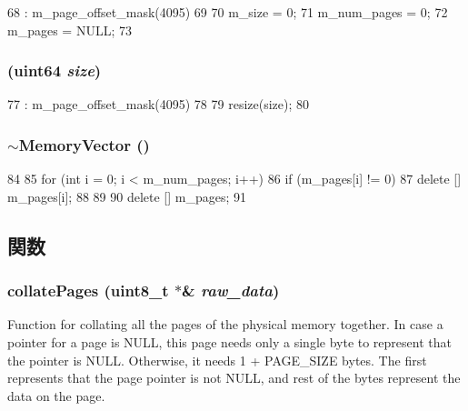 \begin{DoxyCode}
68     : m_page_offset_mask(4095)
69 {
70     m_size = 0;
71     m_num_pages = 0;
72     m_pages = NULL;
73 }
\end{DoxyCode}
\hypertarget{classMemoryVector_a8dabb961f3dfab673f3231af344f0c52}{
\subsubsection[{MemoryVector}]{ ({\bf uint64} {\em size})}}
\label{classMemoryVector_a8dabb961f3dfab673f3231af344f0c52}



\begin{DoxyCode}
77     : m_page_offset_mask(4095)
78 {
79     resize(size);
80 }
\end{DoxyCode}
\hypertarget{classMemoryVector_adb36a662a886ad8dd3877a5989aacdbc}{
\subsubsection[{$\sim$MemoryVector}]{\setlength{\rightskip}{0pt plus 5cm}$\sim${\bf MemoryVector} ()}}
\label{classMemoryVector_adb36a662a886ad8dd3877a5989aacdbc}



\begin{DoxyCode}
84 {
85     for (int i = 0; i < m_num_pages; i++) {
86         if (m_pages[i] != 0) {
87             delete [] m_pages[i];
88         }
89     }
90     delete [] m_pages;
91 }
\end{DoxyCode}


\subsection{関数}
\hypertarget{classMemoryVector_a8b98a578a2b3755a5a07c42ff4475c24}{
\subsubsection[{collatePages}]{ collatePages (uint8\_\-t $\ast$\& {\em raw\_\-data})}}
\label{classMemoryVector_a8b98a578a2b3755a5a07c42ff4475c24}
Function for collating all the pages of the physical memory together. In case a pointer for a page is NULL, this page needs only a single byte to represent that the pointer is NULL. Otherwise, it needs 1 + PAGE\_\-SIZE bytes. The first represents that the page pointer is not NULL, and rest of the bytes represent the data on the page. 


